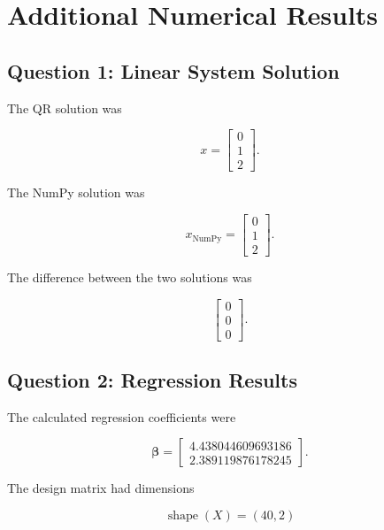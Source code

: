\documentclass[12pt,a4paper]{article}
\numberwithin{equation}{section}
\begin{document}
\appendix

\section{Additional Numerical Results}

\subsection{Question 1: Linear System Solution}

The QR solution was

\begin{equation}
x=
\begin{bmatrix}
0\\1\\2
\end{bmatrix}.
\end{equation}

The NumPy solution was

\begin{equation}
x_{\mathrm{NumPy}}=
\begin{bmatrix}
0\\1\\2
\end{bmatrix}.
\end{equation}

The difference between the two solutions was

\begin{equation}
\begin{bmatrix}
0\\0\\0
\end{bmatrix}.
\end{equation}

\subsection{Question 2: Regression Results}

The calculated regression coefficients were

\begin{equation}
\boldsymbol{\beta}=
\begin{bmatrix}
4.438044609693186\\
2.389119876178245
\end{bmatrix}.
\end{equation}

The design matrix had dimensions

\begin{equation}
\operatorname{shape}(X)=(40,2)
\end{equation}
\end{document}
